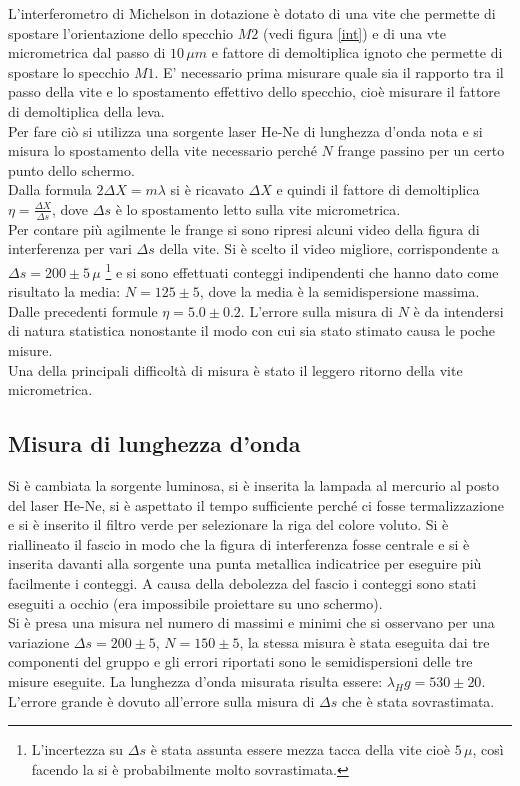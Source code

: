 \documentclass[10pt,a4paper]{article}
\begin{document}
L'interferometro di Michelson in dotazione è dotato di una vite che permette di spostare l'orientazione dello specchio $M2$ (vedi figura \ref{int}) e di una vte micrometrica dal passo di $10 \, \mu m$ e fattore di demoltiplica ignoto che permette di spostare lo specchio $M1$. E' necessario prima misurare quale sia il rapporto tra il passo della vite e lo spostamento effettivo dello specchio, cioè misurare il fattore di demoltiplica della leva. \\
Per fare ciò si utilizza una sorgente laser He-Ne di lunghezza d'onda nota e si misura lo spostamento della vite necessario perché $N$ frange passino per un certo punto dello schermo. \\
Dalla formula $2 \Delta X = m \lambda$ si è ricavato $\Delta X$ e quindi il fattore di demoltiplica $\eta = \frac{\Delta X}{\Delta s}$, dove $\Delta s$ è lo spostamento letto sulla vite micrometrica.\\
Per contare più agilmente le frange si sono ripresi alcuni video della figura di interferenza per vari $\Delta s$ della vite. Si è scelto il video migliore, corrispondente a $\Delta s = 200 \pm 5 \, \mu $ \footnote{L'incertezza su $\Delta s$ è stata assunta essere mezza tacca della vite cioè $5 \, \mu$, così facendo la si è probabilmente molto sovrastimata.} e si sono effettuati conteggi indipendenti che hanno dato come risultato la media: $N = 125 \pm 5$, dove la media è la semidispersione massima. Dalle precedenti formule $\eta = 5.0 \pm 0.2$. L'errore sulla misura di $N$ è da intendersi di natura statistica nonostante il modo con cui sia stato stimato causa le poche misure.\\
Una della principali difficoltà di misura è stato il leggero ritorno della vite micrometrica.\\

\subsection{Misura di lunghezza d'onda}
Si è cambiata la sorgente luminosa, si è inserita la lampada al mercurio al posto del laser He-Ne, si è aspettato il tempo sufficiente perché ci fosse termalizzazione e si è inserito il filtro verde per selezionare la riga del colore voluto. Si è riallineato il fascio in modo che la figura di interferenza fosse centrale e si è inserita davanti alla sorgente una punta metallica indicatrice per eseguire più facilmente i conteggi. A causa della debolezza del fascio i conteggi sono stati eseguiti a occhio (era impossibile proiettare su uno schermo).\\
Si è presa una misura nel numero di massimi e minimi che si osservano per una variazione $\Delta s = 200 \pm 5$, $N = 150 \pm 5$, la stessa misura è stata eseguita dai tre componenti del gruppo e gli errori riportati sono le semidispersioni delle tre misure eseguite. La lunghezza d'onda misurata risulta essere: $\lambda_Hg = 530 \pm 20$. L'errore grande è dovuto all'errore sulla misura  di $\Delta s$ che è stata sovrastimata.\\
\end{document}
